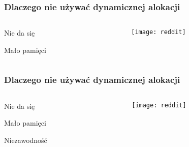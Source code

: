 \documentclass{beamer}
\makeatletter
\newenvironment{myitemize}{%
   \setlength{\topsep}{0pt}
   \setlength{\partopsep}{0pt}
   \renewcommand*{\@listi}{\leftmargin\leftmargini \parsep\z@ \topsep\z@ \itemsep\z@}
   \let\@listI\@listi
   \itemize
}{\enditemize}
\makeatother
\begin{document}
\begin{frame}[t]
    \frametitle{Dlaczego nie używać dynamicznej alokacji}

    \begin{columns}
        \begin{column}[t]{0.35\textwidth}
            \begin{myitemize}
                \item Nie da się
                \item Mało pamięci
            \end{myitemize}
        \end{column}
        \begin{column}[t]{0.7\textwidth}
            \begin{center}
            \texttt{[image: reddit]}\\
            \tiny \cite{reddit} 
            \end{center}
        \end{column}
    \end{columns}
\end{frame}
\begin{frame}[t]
    \frametitle{Dlaczego nie używać dynamicznej alokacji}

    \begin{columns}[t]
        \begin{column}[t]{0.35\textwidth}
            \begin{myitemize}
                \item Nie da się
                \item Mało pamięci
                \item Niezawodność
            \end{myitemize}
        \end{column}
        \begin{column}[t]{0.7\textwidth}
            \begin{center}
                \texttt{[image: reddit]}\\
                \tiny \cite{reddit} 
            \end{center}
        \end{column}
    \end{columns}
\end{frame}
\end{document}
